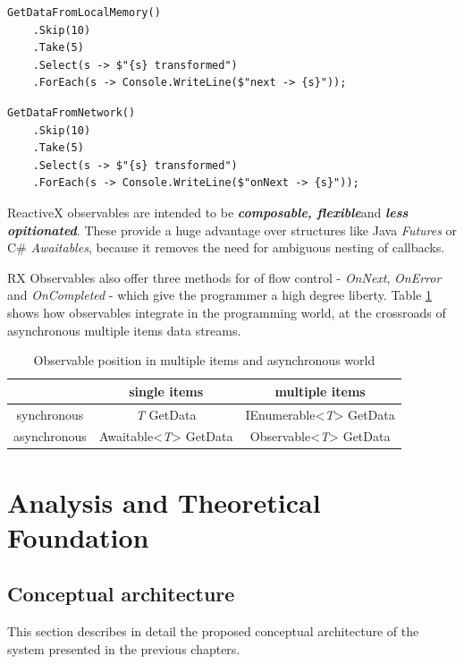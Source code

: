 \documentclass[12pt,a4paper,twoside]{report}
\begin{document}
\begin{lstlisting}[caption=Iterable, label=alg:iterable]
  GetDataFromLocalMemory()
    .Skip(10)
    .Take(5)
    .Select(s -> $"{s} transformed")
    .ForEach(s -> Console.WriteLine($"next -> {s}"));
\end{lstlisting}

\begin{lstlisting}[caption=Observable, label=alg:observable]
  GetDataFromNetwork()
    .Skip(10)
    .Take(5)
    .Select(s -> $"{s} transformed")
    .ForEach(s -> Console.WriteLine($"onNext -> {s}"));
\end{lstlisting}

ReactiveX observables are intended to be \textbf{\textit{composable, flexible}}and \textbf{\textit{less opitionated}}. These provide a huge advantage over structures like Java \textit{Futures} or C\# \textit{Awaitables}, because it removes the need for ambiguous nesting of callbacks.

RX Observables also offer three methods for of flow control - \textit{OnNext}, \textit{OnError} and \textit{OnCompleted} - which give the programmer a high degree liberty. Table \ref{table:rx} shows how observables integrate in the programming world, at the crossroads of asynchronous multiple items data streams.

\begin{table}[h]
  \centering
  \begin{tabular}{c | c | c}
    & single items & multiple items \\
    \hline
    synchronous & \textit{T} GetData & IEnumerable<\textit{T}> GetData \\
    asynchronous & Awaitable<\textit{T}> GetData & Observable<\textit{T}> GetData
  \end{tabular}
  \caption{Observable position in multiple items and asynchronous world}
  \label{table:rx}
\end{table}

\chapter{Analysis and Theoretical Foundation}

\section{Conceptual architecture}

This section describes in detail the proposed conceptual architecture of the system presented in the previous chapters.
\end{document}
